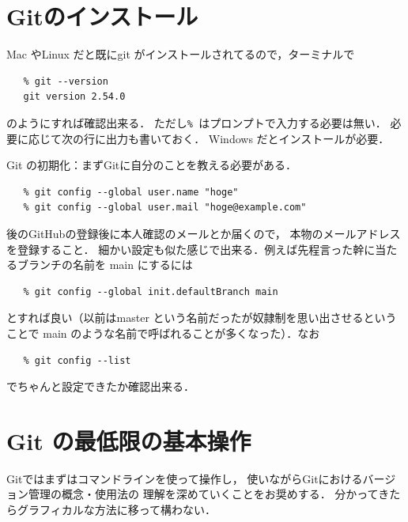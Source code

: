 \section{Gitのインストール}
Mac やLinux だと既にgit がインストールされてるので，ターミナルで
\begin{verbatim}
   % git --version
   git version 2.54.0
\end{verbatim}
のようにすれば確認出来る．
ただし\verb/% /はプロンプトで入力する必要は無い．
必要に応じて次の行に出力も書いておく．
Windows だとインストールが必要．

Git の初期化：まずGitに自分のことを教える必要がある．
\begin{verbatim}
   % git config --global user.name "hoge"
   % git config --global user.mail "hoge@example.com"
\end{verbatim}
後のGitHubの登録後に本人確認のメールとか届くので，
本物のメールアドレスを登録すること．
細かい設定も似た感じで出来る．例えば先程言った幹に当たるブランチの名前を
main にするには
\begin{verbatim}
   % git config --global init.defaultBranch main
\end{verbatim}
とすれば良い（以前はmaster という名前だったが奴隷制を思い出させるということで
main のような名前で呼ばれることが多くなった）．なお
\begin{verbatim}
   % git config --list
\end{verbatim}
でちゃんと設定できたか確認出来る．

\section{Git の最低限の基本操作}
Gitではまずはコマンドラインを使って操作し，
使いながらGitにおけるバージョン管理の概念・使用法の
理解を深めていくことをお奨めする．
分かってきたらグラフィカルな方法に移って構わない．

